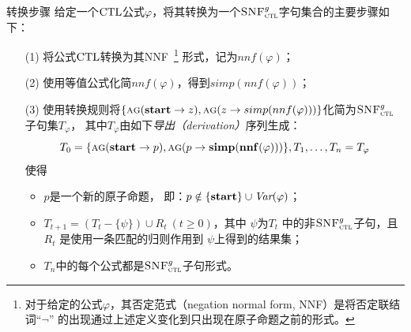 \documentclass[9pt, CJK]{beamer}
\begin{document}
\begin{frame}
{{\begin{block}{转换步骤}
			给定一个$\textrm{CTL}$公式$\varphi$，将其转换为一个${\textsc{SNF}_{\textsc{ctl}}^g}$字句集合的主要步骤如下：
			\begin{itemize}
				\item[(1)]  将公式$\textrm{CTL}$转换为其NNF~\footnote{对于给定的公式$\varphi$，其否定范式（negation normal form, NNF）是将否定联结词“$\neg$” 的出现通过上述定义变化到只出现在原子命题之前的形式。}
				形式，记为$nnf(\varphi)$；
				\item[(2)]  使用等值公式化简$nnf(\varphi)$，得到$simp(nnf(\varphi))$；
				\item[(3)] 使用转换规则将$\{\textsc{a}\textsc{g}(\textbf{start}\rightarrow z), \textsc{a}\textsc{g}(z \rightarrow simp(nnf(\varphi)))\}$化简为${\textsc{SNF}_{\textsc{ctl}}^g}$子句集$T_{\varphi}$，
				其中$T_\varphi$由如下\emph{导出（derivation）}序列生成：
				\[ T_0=\{\textsc{a}\textsc{g}(\textbf{start}\rightarrow p), \textsc{a}\textsc{g}(p\rightarrow {\bf simp}({\bf nnf}(\varphi)))\}, T_1, \ldots, T_n=T_\varphi\]
				使得
				\begin{itemize}
					\item $p$是一个新的原子命题， 即：$p\notin \{\textbf{start}\}\cup\textit{Var}(\varphi)$；
					\item $T_{t+1} = (T_t - \{\psi\}) \cup R_t~(t\ge 0)$，其中 $\psi$为$T_t$ 中的非${\textsc{SNF}_{\textsc{ctl}}^g}$子句，且 $R_t$
					是使用一条匹配的归则作用到 $\psi$上得到的结果集；
					\item  $T_n$中的每个公式都是${\textsc{SNF}_{\textsc{ctl}}^g}$子句形式。
				\end{itemize}
			\end{itemize}
		\end{block}
	}
	}
\end{frame}
\end{document}
